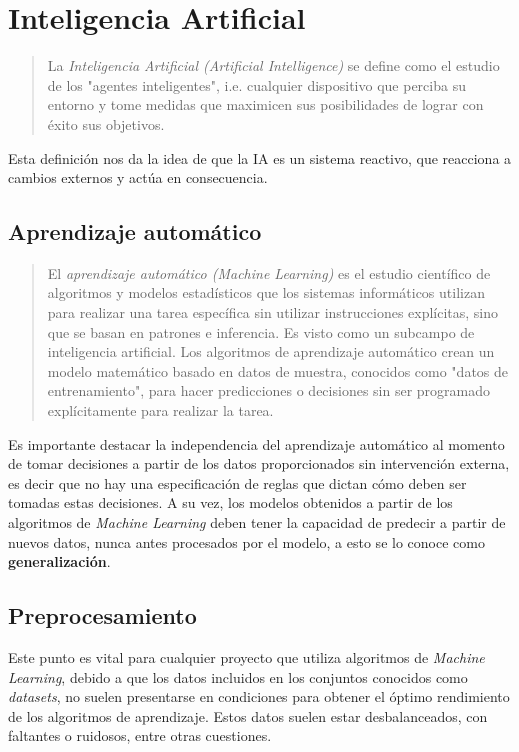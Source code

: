 \documentclass[a4paper,12pt]{article}
\begin{document}
\section{Inteligencia Artificial}

\begin{quote}
  La \textit{Inteligencia Artificial (Artificial Intelligence)} se define como el estudio de los "agentes inteligentes", i.e. cualquier dispositivo que perciba su entorno y tome medidas que maximicen sus posibilidades de lograr con éxito sus objetivos.
  
  \hfill \citet{poole1998}
\end{quote}

Esta definición nos da la idea de que la IA es un sistema reactivo, que reacciona a cambios externos y actúa en consecuencia.

\subsection{Aprendizaje automático} \label{machinelearning}

\begin{quote}
  El \textit{aprendizaje automático (Machine Learning)} es el estudio científico de algoritmos y modelos estadísticos que los sistemas informáticos utilizan para realizar una tarea específica sin utilizar instrucciones explícitas, sino que se basan en patrones e inferencia. Es visto como un subcampo de inteligencia artificial. Los algoritmos de aprendizaje automático crean un modelo matemático basado en datos de muestra, conocidos como "datos de entrenamiento", para hacer predicciones o decisiones sin ser programado explícitamente para realizar la tarea.
  
  \hfill \citet{bishop2006pattern}
\end{quote}

Es importante destacar la independencia del aprendizaje automático al momento de tomar decisiones a partir de los datos proporcionados sin intervención externa, es decir que no hay una especificación de reglas que dictan cómo deben ser tomadas estas decisiones. A su vez, los modelos obtenidos a partir de los algoritmos de \textit{Machine Learning} deben tener la capacidad de predecir a partir de nuevos datos, nunca antes procesados por el modelo, a esto se lo conoce como \textbf{generalización}. 

\subsection{Preprocesamiento} \label{preprocessing}
Este punto es vital para cualquier proyecto que utiliza algoritmos de \textit{Machine Learning}, debido a que los datos incluidos en los conjuntos conocidos como \textit{datasets}, no suelen presentarse en condiciones para obtener el óptimo rendimiento de los algoritmos de aprendizaje. Estos datos suelen estar desbalanceados, con faltantes o ruidosos, entre otras cuestiones. 
\end{document}
